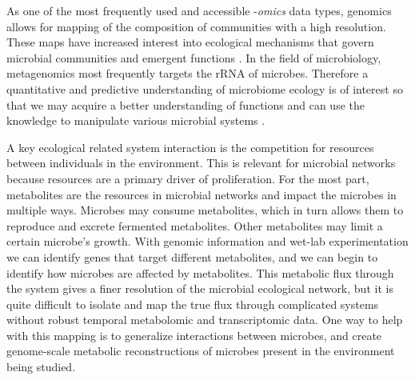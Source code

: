 As one of the most frequently used and accessible -\textit{omics} data types, genomics allows for mapping of the composition of communities with a high resolution. These maps have increased interest into ecological mechanisms that govern microbial communities and emergent functions \citep{Costello2012}. In the field of microbiology, metagenomics most frequently targets the \acrshort{rRNA} of microbes. Therefore a quantitative and predictive understanding of microbiome ecology is of interest so that we may acquire a better understanding of functions and can use the knowledge to manipulate various microbial systems \citep{Goldford2018}. 

A key ecological related system interaction is the competition for resources between individuals in the environment. This is relevant for microbial networks because resources are a primary driver of proliferation. For the most part, metabolites are the resources in microbial networks and impact the microbes in multiple ways. Microbes may consume metabolites, which in turn allows them to reproduce and excrete fermented metabolites. Other metabolites may limit a certain microbe's growth. With genomic information and wet-lab experimentation we can identify genes that target different metabolites, and we can begin to identify how microbes are affected by metabolites. This metabolic flux through the system gives a finer resolution of the microbial ecological network, but it is quite difficult to isolate and map the true flux through complicated systems without robust temporal metabolomic and transcriptomic data. One way to help with this mapping is to generalize interactions between microbes, and create genome-scale metabolic reconstructions of microbes present in the environment being studied. 

